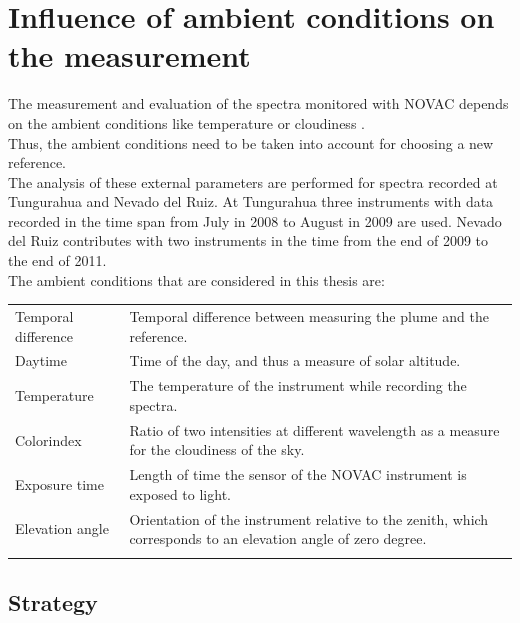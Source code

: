 \section{Influence of ambient conditions on the measurement \label{Chap:BROErr}}
The measurement and evaluation of the spectra monitored with NOVAC depends on the ambient conditions like temperature or cloudiness \citep{lubcke2014optical}.\\
Thus, the ambient conditions need to be taken into account for choosing a new reference.\\
The analysis of these external parameters are performed for spectra recorded at Tungurahua and Nevado del Ruiz. At Tungurahua three instruments with data recorded in the time span from July in 2008 to August in 2009 are used. Nevado del Ruiz contributes with two instruments in the time from the end of 2009 to the end of 2011.\\
%
The ambient conditions that are considered in this thesis are:
\begin{table}[h!]
	\centering
	\begin{tabular}{p{4cm}p{8.5cm}}
		Temporal difference &Temporal difference between measuring the plume and the reference.\\
		Daytime & Time of the day, and thus a measure of solar altitude.\\
		Temperature& The temperature of the instrument while recording the spectra.\\
		Colorindex&Ratio of two intensities at different wavelength as a measure for the cloudiness of the sky.\\
		Exposure time& Length of time the sensor of the NOVAC instrument is exposed to light.\\
		Elevation angle& Orientation of the instrument relative to the zenith, which corresponds to an elevation angle of zero degree.\\
		\label{tab:externalparametters}
	\end{tabular}
\end{table}	
%



\subsection{Strategy}

